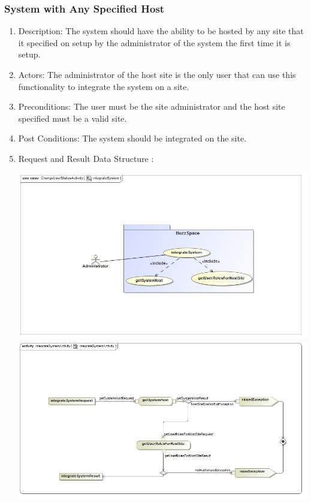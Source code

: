 \documentclass[hidelinks, 12pt, oneside]{article}
\begin{document}
\subsubsection{System with Any Specified Host}
\begin{enumerate}
\item Description: The system should have the ability to be hosted by any site that it specified on setup by the administrator of the system the first time it is setup.
\item Actors: The administrator of the host site is the only user that can use this functionality to integrate the system on a site.
\item Preconditions: The user must be the site administrator and the host site specified must be a valid site.
\item Post Conditions: The system should be integrated on the site.
\item Request and Result Data Structure : 
\begin{center}
\includegraphics[scale=0.5]{integrateSystem.jpg}
\includegraphics[scale=0.5]{integrateSystemActivity.jpg}
\end{center}
\end{enumerate}
\end{document}
